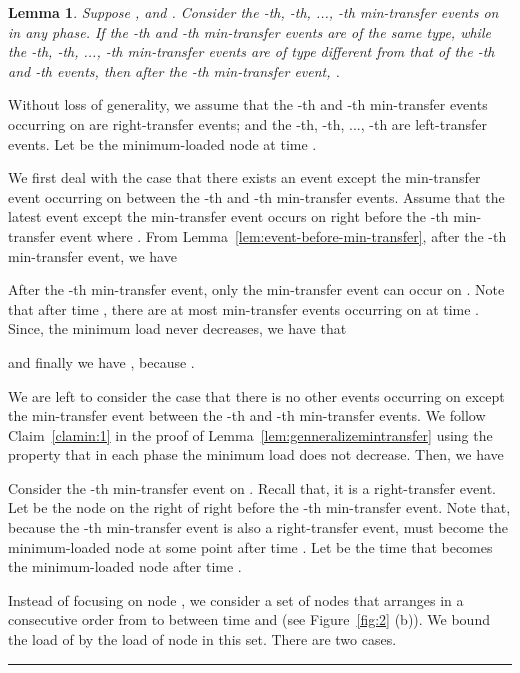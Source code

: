 \documentclass[a4paper]{article}
\newtheorem{lemma}{Lemma}
\newenvironment{proof}{{\bf Proof:}}{\hfill\rule{1.5mm}{3mm}\vspace{0.1in}}
\begin{document}
\begin{lemma}
  \label{lem:genneralizemintransfer2}
  Suppose ,
   and . Consider the -th,
  -th, ..., -th min-transfer events on  in
  any phase. If the -th and -th min-transfer
  events are of the same type, while the -th, -th, ...,
  -th min-transfer events are of type different from that of
  the -th and -th events, then after the -th
  min-transfer event, .
\end{lemma}

\begin{proof}
  Without loss of generality, we assume that the -th and 
  -th min-transfer events occurring on  are 
  right-transfer events; and the -th, -th,
  ..., -th are  left-transfer events. Let  be the
  minimum-loaded node at time .
 
  We first deal with the case that there exists an event except the
  min-transfer event occurring on  between the -th and
   -th min-transfer events. Assume that the latest
  event except the min-transfer event occurs on  right before the
  -th min-transfer event where . From
  Lemma~\ref{lem:event-before-min-transfer}, after the -th
  min-transfer event, we have
  
  
  After the -th min-transfer event, only the
  min-transfer event can occur on .  Note that after time ,
  there are at most  min-transfer events occurring on  at
  time . Since, the minimum load never decreases, we have
  that
  
  

  and finally we have , because .
  
  We are left to consider the case that there is no other events
  occurring on  except the min-transfer event between the -th
  and -th min-transfer events. We follow Claim~\ref{clamin:1} in the proof
  of Lemma~\ref{lem:genneralizemintransfer} using the property that in
  each phase the minimum load does not decrease. Then, we have
  
  

  Consider the -th min-transfer event on . Recall that, it is a
  right-transfer event. Let  be the node on the right of 
  right before the -th min-transfer event.  Note
  that, because the -th min-transfer event is also
  a right-transfer event,  must become the minimum-loaded
  node at some point after time .  Let  be the time that  becomes the minimum-loaded
  node after time .
 
  Instead of focusing on node , we consider a set of nodes 
  that arranges in a consecutive order from  to  between
  time  and  (see Figure~\ref{fig:2} (b)). We 
  bound the load of  by the load of node in this set. There are two
  cases.


\end{proof}
\end{document}
